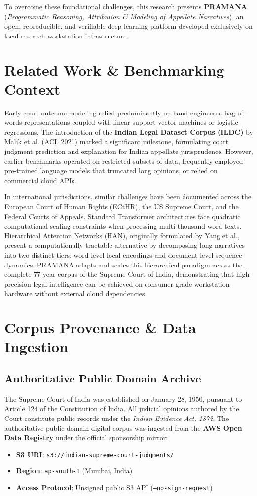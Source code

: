 \documentclass[journal,10pt,twocolumn]{IEEEtran}
\begin{document}
To overcome these foundational challenges, this research presents \textbf{PRAMANA} (\textit{Programmatic Reasoning, Attribution \& Modeling of Appellate Narratives}), an open, reproducible, and verifiable deep-learning platform developed exclusively on local research workstation infrastructure.

\section{Related Work & Benchmarking Context}
Early court outcome modeling relied predominantly on hand-engineered bag-of-words representations coupled with linear support vector machines or logistic regressions. The introduction of the \textbf{Indian Legal Dataset Corpus (ILDC)} by Malik et al. (ACL 2021) marked a significant milestone, formulating court judgment prediction and explanation for Indian appellate jurisprudence. However, earlier benchmarks operated on restricted subsets of data, frequently employed pre-trained language models that truncated long opinions, or relied on commercial cloud APIs.

In international jurisdictions, similar challenges have been documented across the European Court of Human Rights (ECtHR), the US Supreme Court, and the Federal Courts of Appeals. Standard Transformer architectures face quadratic computational scaling constraints when processing multi-thousand-word texts. Hierarchical Attention Networks (HAN), originally formulated by Yang et al., present a computationally tractable alternative by decomposing long narratives into two distinct tiers: word-level local encodings and document-level sequence dynamics. PRAMANA adapts and scales this hierarchical paradigm across the complete 77-year corpus of the Supreme Court of India, demonstrating that high-precision legal intelligence can be achieved on consumer-grade workstation hardware without external cloud dependencies.

\section{Corpus Provenance & Data Ingestion}
\subsection{Authoritative Public Domain Archive}
The Supreme Court of India was established on January 28, 1950, pursuant to Article 124 of the Constitution of India. All judicial opinions authored by the Court constitute public records under the \textit{Indian Evidence Act, 1872}. The authoritative public domain digital corpus was ingested from the \textbf{AWS Open Data Registry} under the official sponsorship mirror:
\begin{itemize}
    \item \textbf{S3 URI}: \texttt{s3://indian-supreme-court-judgments/}
    \item \textbf{Region}: \texttt{ap-south-1} (Mumbai, India)
    \item \textbf{Access Protocol}: Unsigned public S3 API (\texttt{--no-sign-request})
\end{itemize}
\end{document}
